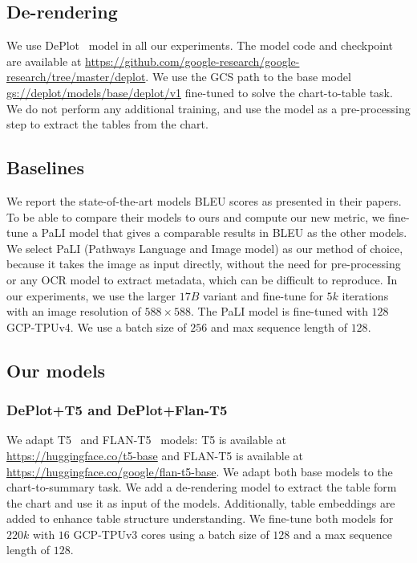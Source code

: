 \subsection{De-rendering}
\label{app:Deplot}
We use DePlot~\citep{liu-etal-2023-deplot} model in all our experiments. The model code and checkpoint are available at \url{https://github.com/google-research/google-research/tree/master/deplot}. We use the GCS path to the base model \url{gs://deplot/models/base/deplot/v1} fine-tuned to solve the chart-to-table task. We do not perform any additional training, and use the model as a pre-processing step to extract the tables from the chart.


\subsection{Baselines}
We report the state-of-the-art models BLEU scores as presented in their papers. To be able to compare their models to ours and compute our new metric, we fine-tune a PaLI \cite{chen2023pali} model that gives a comparable results in BLEU as the other models. We select PaLI (Pathways Language and Image model) as our method of choice, because it takes the image as input directly, without the need for pre-processing or any OCR model to extract metadata, which can be difficult to reproduce.
In our experiments, we use the larger $17B$ variant and fine-tune for $5k$ iterations with an image resolution of $588\times588$. The PaLI model is fine-tuned with $128$ GCP-TPUv4. We use a batch size of $256$ and max sequence length of $128$.

\subsection{Our models}
\subsubsection{DePlot+T5 and DePlot+Flan-T5}
\label{app:flan_t5}
We adapt T5~\cite{raffel2020exploring} and FLAN-T5~\cite{suresh2023semantic} models: T5 is available at \url{https://huggingface.co/t5-base} and FLAN-T5 is available at \url{https://huggingface.co/google/flan-t5-base}. We adapt both base models to the chart-to-summary task. We add a de-rendering model to extract the table form the chart and use it as input of the models. Additionally, table embeddings are added to enhance table structure understanding. We fine-tune both models for $220k$ with $16$ GCP-TPUv3 cores using a batch size of $128$ and a max sequence length of $128$.

